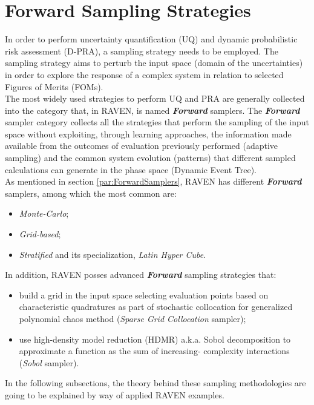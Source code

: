 \section{Forward Sampling Strategies}
In order to perform uncertainty quantification (UQ) and dynamic
probabilistic risk assessment (D-PRA),
a sampling strategy needs to be employed. The sampling strategy aims to
perturb the input space (domain of the uncertainties) in order to explore
the response of a complex system in relation to selected Figures of 
Merits (FOMs). 
\\The most widely used strategies to perform UQ and PRA are generally
collected into the category that, in RAVEN, is named \textit{\textbf{Forward}} samplers. The \textit{\textbf{Forward}} sampler category collects all the strategies that perform the sampling of the input space without exploiting, through learning approaches, the information made available from the outcomes of evaluation previously performed (adaptive sampling) and the common system evolution (patterns) that different sampled calculations can generate in the phase space (Dynamic Event Tree). 
\\As mentioned in section \ref{par:ForwardSamplers}, RAVEN has
different \textit{\textbf{Forward}} samplers, among which the most 
common are:
\begin{itemize}
  \item \textit{Monte-Carlo};
  \item \textit{Grid-based};
  \item \textit{Stratified} and its specialization, \textit{Latin Hyper Cube}.
\end{itemize}
In addition, RAVEN posses advanced \textit{\textbf{Forward}} sampling strategies that:
\begin{itemize}
  \item build a grid in the input space selecting evaluation points 
  based on characteristic quadratures as part of stochastic collocation 
  for generalized polynomial chaos method (\textit{Sparse 
  Grid Collocation} sampler);
  \item use high-density model reduction (HDMR) a.k.a. Sobol 
  decomposition to approximate a function as the sum of increasing-
  complexity interactions (\textit{Sobol} sampler).
\end{itemize} 
In the following subsections, the theory behind these sampling 
methodologies are going to be explained by way of applied RAVEN 
examples.

